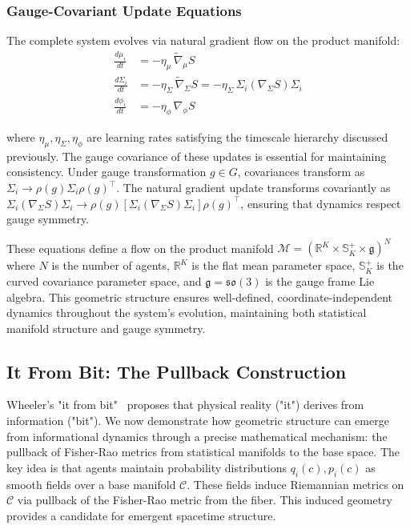 \documentclass[11pt]{article}
\begin{document}
\subsubsection{Gauge-Covariant Update Equations}

The complete system evolves via natural gradient flow on the product manifold:
\begin{align}
\frac{d\mu_i}{dt} &= -\eta_\mu \, \tilde{\nabla}_\mu S \label{eq:mean_flow} \\
\frac{d\Sigma_i}{dt} &= -\eta_\Sigma \, \tilde{\nabla}_\Sigma S = -\eta_\Sigma \, \Sigma_i (\nabla_\Sigma S) \Sigma_i \label{eq:cov_flow} \\
\frac{d\phi_i}{dt} &= -\eta_\phi \, \nabla_\phi S \label{eq:gauge_flow}
\end{align}

where $\eta_\mu, \eta_\Sigma, \eta_\phi$ are learning rates satisfying the timescale hierarchy discussed previously. The gauge covariance of these updates is essential for maintaining consistency. Under gauge transformation $g \in G$, covariances transform as $\Sigma_i \to \rho(g) \Sigma_i \rho(g)^\top$. The natural gradient update transforms covariantly as $\Sigma_i (\nabla_\Sigma S) \Sigma_i \to \rho(g)[\Sigma_i (\nabla_\Sigma S) \Sigma_i]\rho(g)^\top$, ensuring that dynamics respect gauge symmetry.

These equations define a flow on the product manifold $\mathcal{M} = (\mathbb{R}^K \times \mathbb{S}^+_K \times \mathfrak{g})^N$ where $N$ is the number of agents, $\mathbb{R}^K$ is the flat mean parameter space, $\mathbb{S}^+_K$ is the curved covariance parameter space, and $\mathfrak{g} = \mathfrak{so}(3)$ is the gauge frame Lie algebra. This geometric structure ensures well-defined, coordinate-independent dynamics throughout the system's evolution, maintaining both statistical manifold structure and gauge symmetry.



\subsection{It From Bit: The Pullback Construction}
\label{sec:pullback}

Wheeler's "it from bit"~\cite{Wheeler1990} proposes that physical reality ("it") derives from information ("bit"). We now demonstrate how geometric structure can emerge from informational dynamics through a precise mathematical mechanism: the pullback of Fisher-Rao metrics from statistical manifolds to the base space. The key idea is that agents maintain probability distributions $q_i(c), p_i(c)$ as smooth fields over a base manifold $\mathcal{C}$. These fields induce Riemannian metrics on $\mathcal{C}$ via pullback of the Fisher-Rao metric from the fiber. This induced geometry provides a candidate for emergent spacetime structure.
\end{document}
